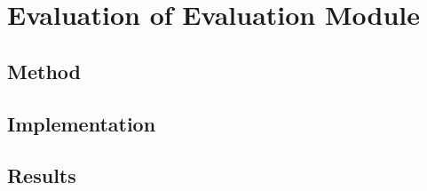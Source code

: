 \section{Evaluation of Evaluation Module}
\subsection{Method}
\subsection{Implementation}
\subsection{Results}
